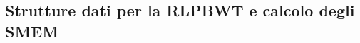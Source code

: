 \documentclass[]{beamer}
\def\RLCP{\mbox{\rm {\sf RLCP}}}
\def\MS{\mbox{\rm {\sf MS}}}
\def\SMEM{\mbox{\rm {\sf SMEM}}}
\begin{document}
\subsection{Strutture dati per la RLPBWT e calcolo degli SMEM}
\end{document}
